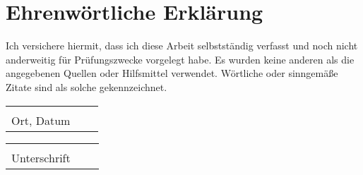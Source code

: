 \clearpage{}
\chapter*{Ehrenwörtliche Erklärung}
Ich versichere hiermit, dass ich diese Arbeit selbstständig verfasst und
noch nicht anderweitig für Prüfungszwecke vorgelegt habe. Es wurden keine anderen
als die angegebenen Quellen oder Hilfsmittel verwendet. Wörtliche oder
sinngemäße Zitate sind als solche gekennzeichnet.


\vspace{15,5 cm} 
\begin{tabular}{p{7cm}p{.5cm}l}
\dotfill \\ 
Ort, Datum
\end{tabular}%
\hfill 
\begin{tabular}{p{7cm}p{.5cm}l}
\dotfill \\ 
Unterschrift 
\end{tabular}%
